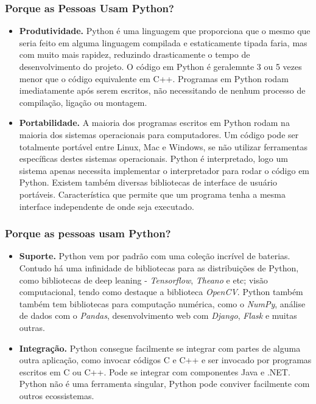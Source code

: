 \documentclass[aspectratio=169]{beamer}
\begin{document}
\begin{frame}
    \frametitle{Porque as Pessoas Usam Python?}
    \begin{itemize}
        \item \textbf{Produtividade.} Python é uma linguagem que proporciona que o
mesmo que seria feito em alguma linguagem compilada e estaticamente tipada faria, mas com
muito mais rapidez, reduzindo drasticamente o tempo de desenvolvimento do projeto. O
código em Python é geralemnte 3 ou 5 vezes menor que o código equivalente em C++. Programas
em Python rodam imediatamente após serem escritos, não necessitando de nenhum processo de
compilação, ligação ou montagem.
        \item \textbf{Portabilidade.} A maioria dos programas escritos em Python rodam
na maioria dos sistemas operacionais para computadores. Um código pode ser totalmente
portável entre Linux, Mac e Windows, se não utilizar ferramentas específicas destes
sistemas operacionais. Python é interpretado, logo um sistema apenas necessita implementar
o interpretador para rodar o código em Python. Existem
também diversas bibliotecas de interface de usuário portáveis. Característica que permite que
um programa tenha a mesma interface independente de onde seja executado.
    \end{itemize}
\end{frame}

\begin{frame}
    \frametitle{Porque as pessoas usam Python?}
    \begin{itemize}
        \item \textbf{Suporte.} Python vem por padrão com uma coleção incrível de baterias.
Contudo há uma infinidade de bibliotecas para as distribuições de Python, como bibliotecas
de deep leaning - \textit{Tensorflow}, \textit{Theano} e etc; visão computacional,
tendo como destaque a biblioteca \textit{OpenCV}. Python também também tem bibliotecas para
computação numérica, como o \textit{NumPy}, análise de dados com o \textit{Pandas},
desenvolvimento web com \textit{Django}, \textit{Flask} e muitas outras.
        \item \textbf{Integração.} Python consegue facilmente se integrar com partes
de alguma outra aplicação, como invocar códigos C e C++ e ser invocado por programas escritos
em C ou C++. Pode se integrar com componentes Java e .NET. Python não é uma ferramenta
singular, Python pode conviver facilmente com outros ecossistemas.
    \end{itemize}
\end{frame}
\end{document}

